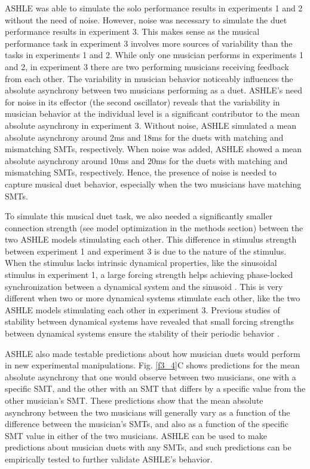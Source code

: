 \documentclass{report}
\begin{document}
ASHLE was able to simulate the solo performance results in experiments 1 and 2 without the need of noise. However, noise was necessary to simulate the duet performance results in experiment 3. This makes sense as the musical performance task in experiment 3 involves more sources of variability than the tasks in experiments 1 and 2. While only one musician performs in experiments 1 and 2, in experiment 3 there are two performing musicians receiving feedback from each other. The variability in musician behavior noticeably influences the absolute asynchrony between two musicians performing as a duet. ASHLE's need for noise in its effector (the second oscillator) reveals that the variability in musician behavior at the individual level is a significant contributor to the mean absolute asynchrony in experiment 3. Without noise, ASHLE simulated a mean absolute asynchrony around 2ms and 18ms for the duets with matching and mismatching SMTs, respectively. When noise was added, ASHLE showed a mean absolute asynchrony around 10ms and 20ms for the duets with matching and mismatching SMTs, respectively. Hence, the presence of noise is needed to capture musical duet behavior, especially when the two musicians have matching SMTs.

To simulate this musical duet task, we also needed a significantly smaller connection strength (see model optimization in the methods section) between the two ASHLE models stimulating each other. This difference in stimulus strength between experiment 1 and experiment 3 is due to the nature of the stimulus. When the stimulus lacks intrinsic dynamical properties, like the sinusoidal stimulus in experiment 1, a large forcing strength helps achieving phase-locked synchronization between a dynamical system and the sinusoid \cite{kim2015signal}. This is very different when two or more dynamical systems stimulate each other, like the two ASHLE models stimulating each other in experiment 3. Previous studies of stability between dynamical systems have revealed that small forcing strengths between dynamical systems ensure the stability of their periodic behavior \cite{kim2015signal}.

ASHLE also made testable predictions about how musician duets would perform in new experimental manipulations. Fig.{} \ref{f3_4}C shows predictions for the mean absolute asynchrony that one would observe between two musicians, one with a specific SMT, and the other with an SMT that differs by a specific value from the other musician's SMT. These predictions show that the mean absolute asynchrony between the two musicians will generally vary as a function of the difference between the musician's SMTs, and also as a function of the specific SMT value in either of the two musicians. ASHLE can be used to make predictions about musician duets with any SMTs, and such predictions can be empirically tested to further validate ASHLE's behavior.
\end{document}
